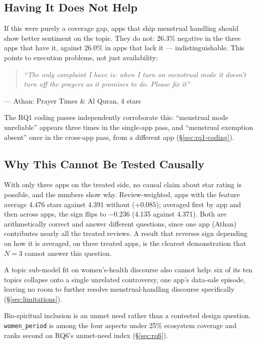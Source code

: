 \subsection{Having It Does Not Help}

If this were purely a coverage gap, apps that ship menstrual handling should
show better sentiment on the topic. They do not: 26.3\% negative in the three
apps that have it, against 26.0\% in apps that lack it --- indistinguishable.
This points to execution problems, not just availability:

\begin{quote}
\itshape ``The only complaint I have is: when I turn on menstrual mode it
doesn't turn off the prayers as it promises to do. Please fix it''
\end{quote}
\hspace*{1em}--- Athan: Prayer Times \& Al Quran, 4 stars

The RQ1 coding passes independently corroborate this: ``menstrual mode
unreliable'' appears three times in the single-app pass, and ``menstrual
exemption absent'' once in the cross-app pass, from a different app
(\S\ref{sec:rq1-coding}).

\subsection{Why This Cannot Be Tested Causally}

With only three apps on the treated side, no causal claim about star rating is
possible, and the numbers show why. Review-weighted, apps with the feature
average 4.476 stars against 4.391 without (\(+0.085\)); averaged first by app
and then across apps, the sign flips to \(-0.236\) (4.135 against 4.371). Both
are arithmetically correct and answer different questions, since one app
(Athan) contributes nearly all the treated reviews. A result that reverses sign
depending on how it is averaged, on three treated apps, is the clearest
demonstration that \(N=3\) cannot answer this question.

A topic sub-model fit on women's-health discourse also cannot help: six of its
ten topics collapse onto a single unrelated controversy, one app's data-sale
episode, leaving no room to further resolve menstrual-handling discourse
specifically (\S\ref{sec:limitations}).

Bio-spiritual inclusion is an unmet need rather than a contested design
question. \texttt{women\_period} is among the four aspects under 25\%
ecosystem coverage and ranks second on RQ6's unmet-need index
(\S\ref{sec:rq6}).
